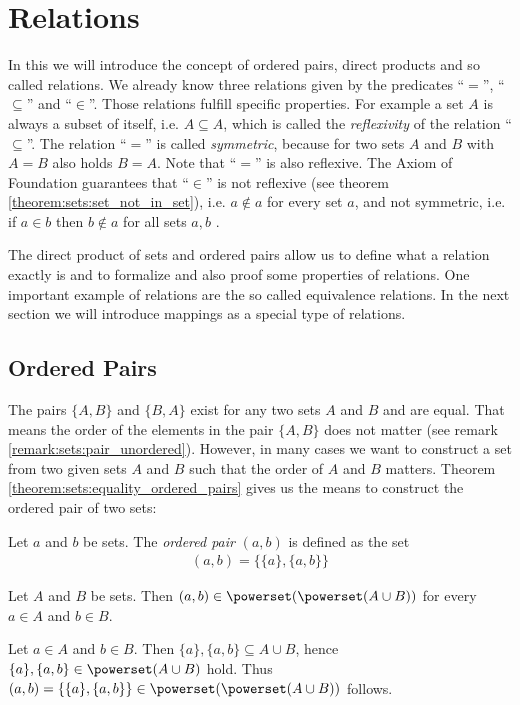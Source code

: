 \section{Relations}

In this we will introduce the concept of ordered pairs, direct products and so called relations. We already know three relations given by the predicates \enquote{$=$}, \enquote{$\subseteq$} and \enquote{$\in$}. Those relations fulfill specific properties. For example a set $A$ is always a subset of itself, i.e. $A\subseteq A$, which is called the \emph{reflexivity} of the relation \enquote{$\subseteq$}. The relation \enquote{$=$} is called \emph{symmetric}, because for two sets $A$ and $B$ with $A=B$ also holds $B=A$. Note that \enquote{$=$} is also reflexive. The Axiom of Foundation guarantees that \enquote{$\in$} is not reflexive (see theorem \ref{theorem:sets:set_not_in_set}), i.e. $a\notin a$ for every set $a$, and not symmetric, i.e. if $a\in b$ then $b\notin a$ for all sets $a,b$ .

The direct product of sets and ordered pairs allow us to define what a relation exactly is and to formalize and also proof some properties of relations. One important example of relations are the so called equivalence relations. In the next section we will introduce mappings as a special type of relations.

\subsection{Ordered Pairs}

The pairs $\{A,B\}$ and $\{B,A\}$ exist for any two sets $A$ and $B$ and are equal. That means the order of the elements in the pair $\{A,B\}$ does not matter (see remark \ref{remark:sets:pair_unordered}). However, in many cases we want to construct a set from two given sets $A$ and $B$ such that the order of $A$ and $B$ matters. Theorem \ref{theorem:sets:equality_ordered_pairs} gives us the means to construct the ordered pair of two sets:

\begin{definition}
    Let $a$ and $b$ be sets. The \emph{ordered pair} $(a,b)$ is defined as the set \begin{align}(a,b)=\{\{a\},\{a,b\}\}\end{align}
\end{definition}

\begin{remarks}
    \begin{remarkenumerate}
        \item Let $A$ and $B$ be sets. Then $(a,b)\in \powerset(\powerset(A\cup B))$ for every $a\in A$ and $b\in B$.
        \begin{miniproof}
            Let $a\in A$ and $b\in B$. Then $\{a\},\{a,b\}\subseteq A\cup B$, hence $\{a\},\{a,b\}\in\powerset(A\cup B)$ hold. Thus $(a,b)=\{\{a\},\{a,b\}\}\in\powerset(\powerset(A\cup B))$ follows.
        \end{miniproof}
    \end{remarkenumerate}
\end{remarks}

